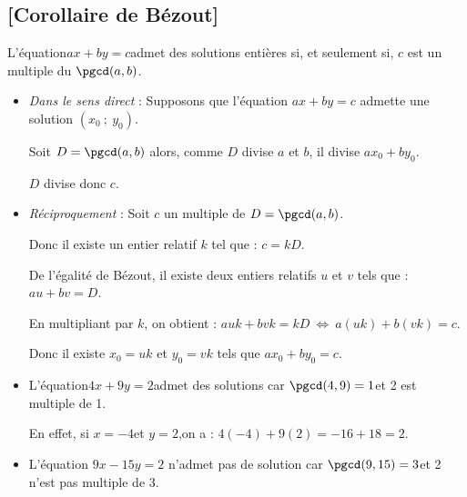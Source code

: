 \subsection{[Corollaire de Bézout]{}}

\begin{propriete}

L'équation\enskip $ax+by=c$\enskip admet des solutions entières si, et seulement si, $c$ est un multiple du $\pgcd(a,b)$.
\end{propriete}

\begin{preuve}
\begin{itemize}
\item \emph{Dans le sens direct} : Supposons que l’équation $ax+by=c$
  admette une solution $(x_0\ ;\ y_0)$.

  Soit $D=\pgcd(a,b)$ alors, comme $D$ divise $a$ et $b$, il divise
  $ax_0+by_0$.

  $D$ divise donc $c$.\medskip

\item \emph{Réciproquement} : Soit $c$ un multiple de $D=\pgcd(a,b)$.

  Donc il existe un entier relatif $k$ tel que : $c=kD$.

  De l'égalité de Bézout, il existe deux entiers relatifs $u$ et $v$
  tels que :\enskip $au+bv=D$.

  En multipliant par $k$, on obtient :\enskip
  $auk+bvk=kD\ \Leftrightarrow\ a(uk)+b(vk)=c$.

  Donc il existe $x_0=uk$ et $y_0=vk$ tels que $ax_0+by_0=c$.
\end{itemize}
\end{preuve}

\begin{exemple*1}
\begin{itemize}
\item L'équation\enskip $4x+9y=2$\enskip admet des solutions car $\pgcd(4,9)=1$\enskip et 2 est multiple de 1.

  En effet, si \enskip $x=-4$\enskip et \enskip $y=2$,\enskip on a :
  \enskip $4(-4)+9(2)=-16+18=2$.

\item L'équation \enskip $9x-15y=2$ \enskip n'admet pas de solution car $\pgcd(9,15)=3$\enskip  et 2 n'est pas multiple de 3.
\end{itemize}
\vspace{-\baselineskip}
\end{exemple*1}

